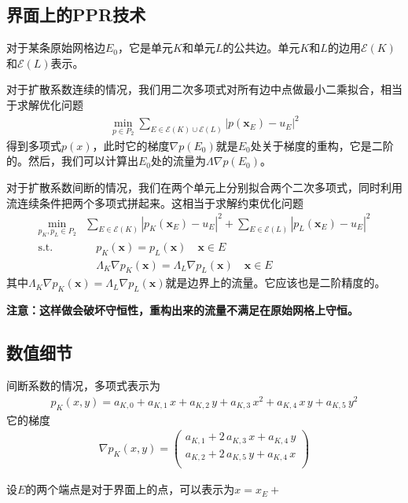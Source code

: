 \documentclass[12pt,a4paper]{article}
\theoremstyle{plain}
\begin{document}
\subsection*{界面上的PPR技术}

对于某条原始网格边$E_0$，它是单元$K$和单元$L$的公共边。单元$K$和$L$的边用$\mathcal{E}(K)$和$\mathcal{E}(L)$表示。

对于扩散系数连续的情况，我们用二次多项式对所有边中点做最小二乘拟合，相当于求解优化问题
\begin{align*}
\min_{p \in P_2} \sum_{E \in \mathcal{E}(K) \cup \mathcal{E}(L)} |p(\bm{x}_E) - u_E|^2
\end{align*}
得到多项式$p(x)$，此时它的梯度$\nabla p(E_0)$就是$E_0$处关于梯度的重构，它是二阶的。然后，我们可以计算出$E_0$处的流量为$\Lambda \nabla p(E_0)$。

对于扩散系数间断的情况，我们在两个单元上分别拟合两个二次多项式，同时利用流连续条件把两个多项式拼起来。这相当于求解约束优化问题
\begin{align*}
\min_{p_{K}, p_{L} \in P_2} & \sum_{E \in \mathcal{E}(K)} |p_{K}(\bm{x}_E) - u_E|^2 + \sum_{E \in \mathcal{E}(L)} |p_{L}(\bm{x}_E) - u_E|^2 \\
\text{s.t.} & \quad p_{K}(\bm{x}) = p_{L}(\bm{x}) \quad \bm{x} \in {E} \\
 & \quad \Lambda_{K} \nabla p_{K}(\bm{x}) = \Lambda_{L} \nabla p_{L}(\bm{x}) \quad \bm{x} \in {E}
\end{align*}
其中$\Lambda_{K} \nabla p_{K}(\bm{x}) = \Lambda_{L} \nabla p_{L}(\bm{x})$就是边界上的流量。它应该也是二阶精度的。

\textbf{注意：这样做会破坏守恒性，重构出来的流量不满足在原始网格上守恒。}

\subsection*{数值细节}

间断系数的情况，多项式表示为
\begin{align*}
p_{K}(x,y) = a_{K,0} + a_{K,1} \, x + a_{K,2} \, y + a_{K,3} \, x^2 + a_{K,4} \, x \, y + a_{K,5} \, y^2
\end{align*}
它的梯度
\begin{align*}
\nabla p_{K}(x,y) =
\left(
\begin{matrix}
a_{K,1} + 2 \, a_{K,3} \, x + a_{K,4} \, y \\
a_{K,2} + 2 \, a_{K,5} \, y + a_{K,4} \, x \\
\end{matrix}
\right)
\end{align*}

设$E$的两个端点是对于界面上的点，可以表示为$x = x_E + $







%
%
\end{document}
